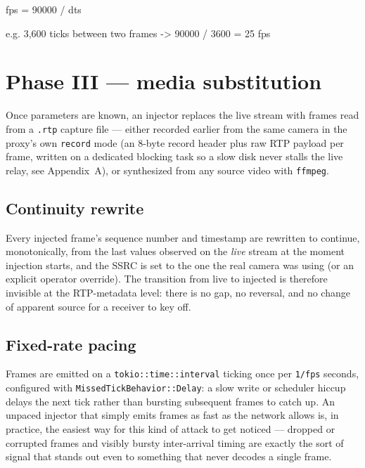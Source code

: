 \documentclass[11pt,a4paper]{article}
\newcommand{\code}[1]{\texttt{\small #1}}
\begin{document}
\begin{consolebox}
\begin{consolev}
fps = 90000 / dts

e.g.  3,600 ticks between two frames -> 90000 / 3600 = \textcolor{accentc}{25 fps}
\end{consolev}
\end{consolebox}

\section{Phase III --- media substitution}
Once parameters are known, an injector replaces the live stream with frames read from a \code{.rtp} capture file --- either recorded earlier from the same camera in the proxy's own \code{record} mode (an 8-byte record header plus raw RTP payload per frame, written on a dedicated blocking task so a slow disk never stalls the live relay, see Appendix~A), or synthesized from any source video with \code{ffmpeg}.

\subsection{Continuity rewrite}
Every injected frame's sequence number and timestamp are rewritten to continue, monotonically, from the last values observed on the \emph{live} stream at the moment injection starts, and the SSRC is set to the one the real camera was using (or an explicit operator override). The transition from live to injected is therefore invisible at the RTP-metadata level: there is no gap, no reversal, and no change of apparent source for a receiver to key off.

\subsection{Fixed-rate pacing}
Frames are emitted on a \code{tokio::time::interval} ticking once per \code{1/fps} seconds, configured with \code{MissedTickBehavior::Delay}: a slow write or scheduler hiccup delays the next tick rather than bursting subsequent frames to catch up. An unpaced injector that simply emits frames as fast as the network allows is, in practice, the easiest way for this kind of attack to get noticed --- dropped or corrupted frames and visibly bursty inter-arrival timing are exactly the sort of signal that stands out even to something that never decodes a single frame.
\end{document}
